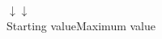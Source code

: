 \documentclass{beamer}
\begin{document}
\begin{frame}[fragile]
\begin{center}
\begin{minipage}{0.49\linewidth}
\end{minipage}
\end{center}
\begin{tiny}
{%
\hspace*{6.8cm}$\downarrow$\hspace*{3cm}$\downarrow$\\
\hspace*{6.0cm}Starting value\hspace*{1.2cm}Maximum value\\
}
\end{tiny}

\end{frame}
\end{document}
